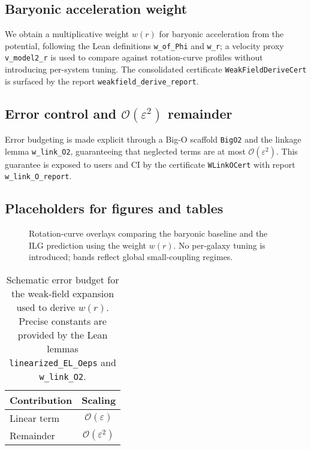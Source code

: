 \documentclass[aps,prd,twocolumn,superscriptaddress,nofootinbib,floatfix,longbibliography]{revtex4-2}
\newcommand{\Order}{\mathcal{O}}
\newcommand{\lean}[1]{\texttt{#1}}
\begin{document}
\subsection{Baryonic acceleration weight}
We obtain a multiplicative weight $w(r)$ for baryonic acceleration from the potential, following the Lean definitions \lean{w_of_Phi} and \lean{w_r}; a velocity proxy \lean{v_model2_r} is used to compare against rotation-curve profiles without introducing per-system tuning. The consolidated certificate \lean{WeakFieldDeriveCert} is surfaced by the report \lean{weakfield_derive_report}.

\subsection{Error control and $\Order(\varepsilon^2)$ remainder}
Error budgeting is made explicit through a Big-O scaffold \lean{BigO2} and the linkage lemma \lean{w_link_O2}, guaranteeing that neglected terms are at most $\Order(\varepsilon^2)$. This guarantee is exposed to users and CI by the certificate \lean{WLinkOCert} with report \lean{w_link_O_report}.

\subsection{Placeholders for figures and tables}
\begin{figure}[t]
  \centering
  \caption{Rotation-curve overlays comparing the baryonic baseline and the ILG prediction using the weight $w(r)$. No per-galaxy tuning is introduced; bands reflect global small-coupling regimes.}
  \label{fig:rc}
\end{figure}

\begin{table}[b]
  \centering
  \begin{tabular}{l c}
    \toprule
    Contribution & Scaling \\
    \midrule
    Linear term & $\Order(\varepsilon)$ \\
    Remainder & $\Order(\varepsilon^2)$ \\
    \bottomrule
  \end{tabular}
  \caption{Schematic error budget for the weak-field expansion used to derive $w(r)$. Precise constants are provided by the Lean lemmas \lean{linearized_EL_Oeps} and \lean{w_link_O2}.}
  \label{tab:weakfield-error}
\end{table}
\end{document}
